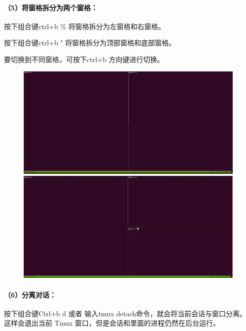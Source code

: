\documentclass[a4paper, 12pt]{article}
\begin{document}
	
	\paragraph{（5）将窗格拆分为两个窗格：}	
	按下组合键ctrl+b \% 将窗格拆分为左窗格和右窗格。
	
	按下组合键ctrl+b " 将窗格拆分为顶部窗格和底部窗格。
	
	要切换到不同窗格，可按下ctrl+b 方向键进行切换。
	
	\begin{figure}[H]
		\centering
		\includegraphics[width=1\textwidth]{016.jpg}
		\includegraphics[width=1\textwidth]{017.jpg}
	\end{figure}
	
	\paragraph{（6）分离对话：}	
	按下组合键Ctrl+b d 或者 输入tmux detach命令，就会将当前会话与窗口分离。
	这样会退出当前 Tmux 窗口，但是会话和里面的进程仍然在后台运行。
	
\end{document}
